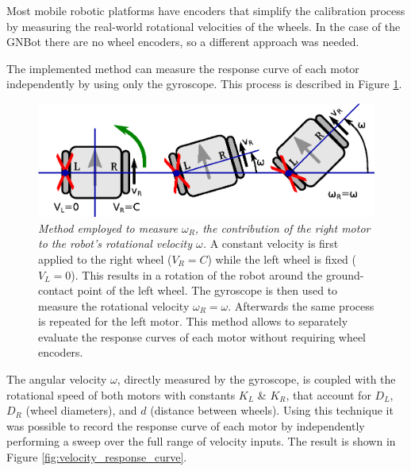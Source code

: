 \documentclass[12pt,twoside]{report}
\begin{document}
Most mobile robotic platforms have encoders that simplify the calibration process by measuring the real-world rotational velocities of the wheels. In the case of the GNBot there are no wheel encoders, so a different approach was needed.

The implemented method can measure the response curve of each motor independently by using only the gyroscope. This process is described in Figure \ref{fig:speed_calib_diagram}.

\begin{figure}[hbtp]
\centerline{
\includegraphics[width=0.75\linewidth]{speed_calib_diagram}}
\caption[Method employed to measure $\omega_R$, the contribution of the right motor to the robot's rotational velocity $\omega$.]{\emph{Method employed to measure $\omega_R$, the contribution of the right motor to the robot's rotational velocity $\omega$.}
A constant velocity is first applied to the right wheel ($V_R=C$) while the left wheel is fixed ($V_L=0$).
This results in a rotation of the robot around the ground-contact point of the left wheel. The gyroscope is then used to measure the rotational velocity $\omega_R=\omega$.
Afterwards the same process is repeated for the left motor.
This method allows to separately evaluate the response curves of each motor without requiring wheel encoders.
}
\label{fig:speed_calib_diagram}
\end{figure}



The angular velocity $\omega$, directly measured by the gyroscope, is coupled with the rotational speed of both motors with constants $K_L$ \& $K_R$, that account for $D_L$, $D_R$ (wheel diameters), and $d$ (distance between wheels).
Using this technique it was possible to record the response curve of each motor by independently performing a sweep over the full range of velocity inputs.
The result is shown in Figure \ref{fig:velocity_response_curve}.
\end{document}
